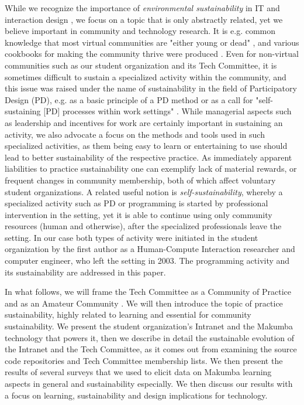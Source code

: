 \documentclass{acm_proc_article-sp}
\begin{document}
While we recognize the importance of {\it environmental sustainability} in IT and interaction design \cite{blevis07}, we focus on a topic that is only abstractly related, yet we believe important in community and technology research. It is e.g. common knowledge that most virtual communities are "either young or dead" \cite{pargman05}, and various cookbooks for making the community thrive were produced \cite{goodwin94}. Even for non-virtual communities such as our student organization and its Tech Committee, it is sometimes difficult to sustain a specialized activity within the community, and this issue was raised under the name of sustainability in the field of Participatory Design (PD), e.g. as a basic principle of a PD method \cite{kensing98} or as a call for "self-sustaining [PD] processes within work settings" \cite{clement93}.  While managerial aspects such as leadership and incentives for work are certainly important in sustaining an activity, we also advocate a focus on the methods and tools used in such specialized activities, as them being easy to learn or entertaining to use should lead to better sustainability of the respective practice. As immediately apparent liabilities to practice sustainability one can exemplify lack of material rewards, or frequent changes in community membership, both of which affect voluntary student organizations. A related useful notion is {\it self-sustainability}, whereby a specialized activity such as PD \cite{clement93} or programming is started by professional intervention in the setting, yet it is able to continue using only community resources (human and otherwise), after the specialized professionals leave the setting. In our case both types of activity were initiated in the student organization  by the first author as a Human-Compute Interaction researcher and computer engineer, who left the setting in 2003. The programming activity and its sustainability are addressed in this paper.

In what follows, we will frame the Tech Committee as a Community of Practice \cite{lave_wenger91, wenger98} and as an Amateur Community \cite{bogdan03, bogdan_bowers07}. We will then introduce the topic of practice sustainability, highly related to learning and essential for community sustainability. We present the student organization's Intranet and the Makumba technology that powers it, then we describe in detail the sustainable evolution of the Intranet and the Tech Committee, as it comes out from examining the source code repositories and Tech Committee membership lists. We then present the results of several surveys 
that we used to elicit data on Makumba learning aspects in general and sustainability especially. We then discuss our results with a focus on learning, sustainability and design implications for technology.
\end{document}
